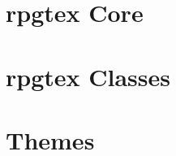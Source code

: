 \documentclass[size=10pt,theme=default]{rpgbook}
\begin{document}
	\part{rpgtex Core}

		

	\part{rpgtex Classes}
		
		
		
	\part{Themes}
		
		
		\RpgActivateLayout{}
		
\end{document}
